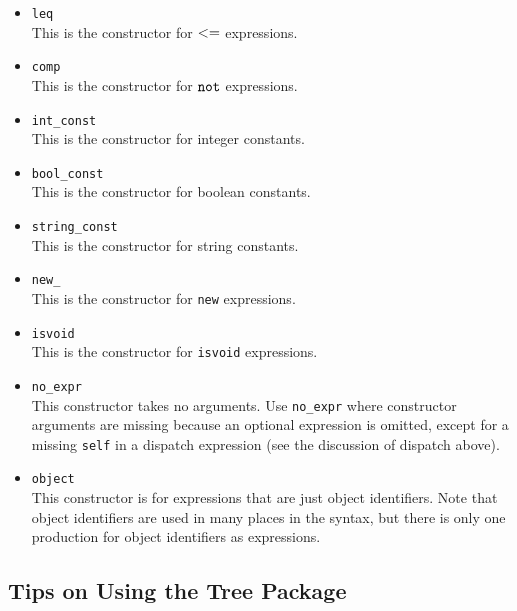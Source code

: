 \documentclass[11pt]{article}
\begin{document}
\begin{itemize}
\item {\tt leq}\\
This is the constructor for $\tt <=$ expressions.

\item {\tt comp}\\
This is the constructor for $\tt not$ expressions.

\item {\tt int\_const}\\
This is the constructor for integer constants.


\item {\tt bool\_const}\\
This is the constructor for boolean constants.

\item {\tt string\_const}\\
This is the constructor for string constants.

\item {\tt new\_}\\
This is the constructor for {\tt new} expressions.

\item {\tt isvoid}\\
This is the constructor for {\tt isvoid} expressions.

\item {\tt no\_expr}\\
This constructor takes no arguments.  Use {\tt no\_expr}
where constructor arguments are missing because an optional expression
is omitted, except for a missing {\tt self} in a dispatch expression
(see the discussion of dispatch above).

\item {\tt object} \\
This constructor is for expressions that are just object identifiers.
Note that object identifiers are used in many places in the syntax,
but there is only one production for object identifiers as expressions.

\end{itemize}

\subsection{Tips on Using the Tree Package}
\end{document}
